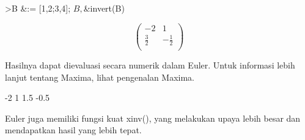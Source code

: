 \documentclass{article}
\begin{document}
\begin{eulernotebook}
\begin{eulercomment}
\begin{eulercomment}
\begin{eulercomment}
\begin{eulercomment}
\begin{eulercomment}
\begin{eulercomment}
\begin{eulerttcomment}
\end{eulerttcomment}
\begin{eulerprompt}
>B &:= [1,2;3,4]; $B, $&invert(B)
\end{eulerprompt}
\begin{eulerformula}
\[
\begin{pmatrix}-2 & 1 \\ \frac{3}{2} & -\frac{1}{2} \\   \end{pmatrix}
\]
\end{eulerformula}
\begin{eulercomment}
Hasilnya dapat dievaluasi secara numerik dalam Euler. Untuk informasi
lebih lanjut tentang Maxima, lihat pengenalan Maxima.
\end{eulercomment}
\begin{euleroutput}
             -2             1 
            1.5          -0.5 
\end{euleroutput}
\begin{eulercomment}
Euler juga memiliki fungsi kuat xinv(), yang melakukan upaya lebih
besar dan mendapatkan hasil yang lebih tepat.


\end{eulercomment}
\end{eulercomment}
\end{eulercomment}
\end{eulercomment}
\end{eulercomment}
\end{eulercomment}
\end{eulercomment}
\end{eulernotebook}
\end{document}
